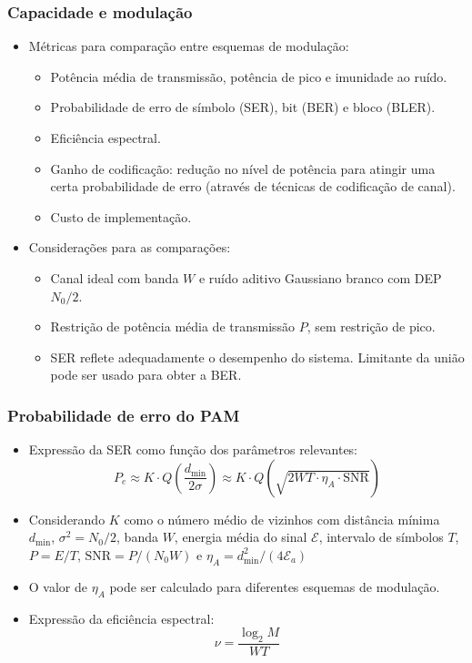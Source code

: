 \begin{frame}
	\frametitle{Capacidade e modulação}

	\begin{itemize}
	    \item Métricas para comparação entre esquemas de modulação:
	    \begin{itemize}
		\item Potência média de transmissão, potência de pico e imunidade ao ruído.
		\item Probabilidade de erro de símbolo (SER), bit (BER) e bloco (BLER).
		\item Eficiência espectral.
		\item Ganho de codificação: redução no nível de potência para atingir uma certa probabilidade de erro (através de técnicas de codificação de canal).
		\item Custo de implementação.
	    \end{itemize}\vspace{0.3cm}
	    \item Considerações para as comparações:
	    \begin{itemize}
		\item Canal ideal com banda $W$ e ruído aditivo Gaussiano branco com DEP $N_0/2$.
		\item Restrição de potência média de transmissão $P$, sem restrição de pico.
		\item SER reflete adequadamente o desempenho do sistema. Limitante da união pode ser usado para obter a BER.
	    \end{itemize}
	\end{itemize}
\end{frame}


\begin{frame}
	\frametitle{Probabilidade de erro do PAM}

	\begin{itemize}
	    \item Expressão da SER como função dos parâmetros relevantes:
	    \begin{equation*}
		P_e \approx K \cdot Q\left(\frac{d_{\min}}{2\sigma} \right) \approx K \cdot Q\left(\sqrt{2WT \cdot \eta_A \cdot \text{SNR}} \right)
	    \end{equation*}
	    \item Considerando $K$ como o número médio de vizinhos com distância mínima $d_{\min}$, $\sigma^2 = N_0/2$, banda $W$, energia média do sinal $\mathcal{E}$, intervalo de símbolos $T$, $P=E/T$, $\text{SNR} = P/(N_0 W)$ e $\eta_A = d_{\min}^2 / (4\mathcal{E}_a)$
	    \item O valor de $\eta_A$ pode ser calculado para diferentes esquemas de modulação.
	    \item Expressão da eficiência espectral:
	    \begin{equation*}
		\nu = \frac{\log_2 M}{WT}
	    \end{equation*}	    
	\end{itemize}
\end{frame}

